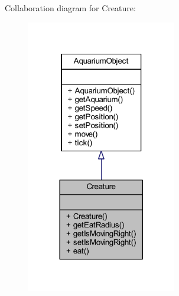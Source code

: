 Collaboration diagram for Creature\+:\nopagebreak
\begin{figure}[H]
\begin{center}
\leavevmode
\includegraphics[width=185pt]{class_creature__coll__graph}
\end{center}
\end{figure}
